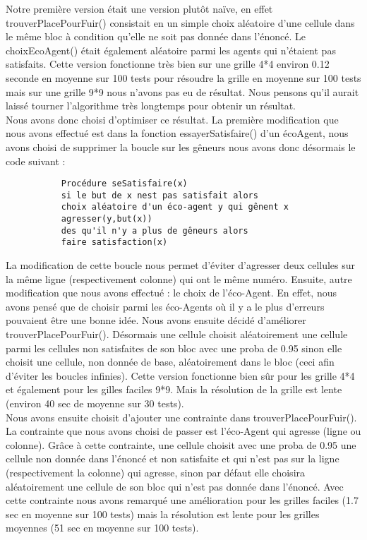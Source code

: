 	Notre première version était une version plutôt naïve, en effet trouverPlacePourFuir() consistait en un simple choix aléatoire d'une cellule dans le même bloc à condition qu'elle ne soit pas donnée dans l'énoncé. Le choixEcoAgent() était également aléatoire parmi les agents qui n'étaient pas satisfaits. Cette version fonctionne très bien sur une grille 4*4 environ 0.12 seconde en moyenne sur 100 tests pour résoudre la grille en moyenne sur 100 tests mais sur une grille 9*9 nous n'avons pas eu de résultat. Nous pensons qu'il aurait laissé tourner l'algorithme très longtemps pour obtenir un résultat. \\
	
	Nous avons donc choisi d'optimiser ce résultat. La première modification que nous avons effectué est dans la fonction essayerSatisfaire() d'un écoAgent, nous avons choisi de supprimer la boucle sur les gêneurs nous avons donc désormais le code suivant :
	 \begin{verbatim}
           Procédure seSatisfaire(x) 
           si le but de x nest pas satisfait alors 
           choix aléatoire d'un éco-agent y qui gênent x 
           agresser(y,but(x))
           des qu'il n'y a plus de gêneurs alors 
           faire satisfaction(x)
     \end{verbatim}
     La modification de cette boucle nous permet d'éviter d'agresser deux cellules sur la même ligne (respectivement colonne) qui ont le même numéro. Ensuite, autre modification que nous avons effectué : le choix de l'éco-Agent. En effet, nous avons pensé que de choisir parmi les éco-Agents où il y a le plus d'erreurs pouvaient être une bonne idée. Nous avons ensuite décidé d'améliorer trouverPlacePourFuir(). Désormais une cellule choisit aléatoirement une cellule parmi les cellules non satisfaites de son bloc avec une proba de 0.95 sinon elle choisit une cellule, non donnée de base, aléatoirement dans le bloc (ceci afin d'éviter les boucles infinies). Cette version fonctionne bien sûr pour les grille 4*4 et également pour les gilles faciles 9*9. Mais la résolution de la grille est lente (environ 40 sec de moyenne sur 30 tests). \\
     
     Nous avons ensuite choisit d'ajouter une contrainte dans trouverPlacePourFuir(). La contrainte que nous avons choisi de passer est l'éco-Agent qui agresse (ligne ou colonne). Grâce à cette contrainte, une cellule choisit avec une proba de 0.95 une cellule non donnée dans l'énoncé et non satisfaite et qui n'est pas sur la ligne (respectivement la colonne) qui agresse,  sinon par défaut elle choisira aléatoirement une cellule de son bloc qui n'est pas donnée dans l'énoncé. Avec cette contrainte nous avons remarqué une amélioration pour les grilles faciles (1.7 sec en moyenne sur 100 tests) mais la résolution est lente pour les grilles moyennes (51 sec en moyenne sur 100 tests). \\
     
